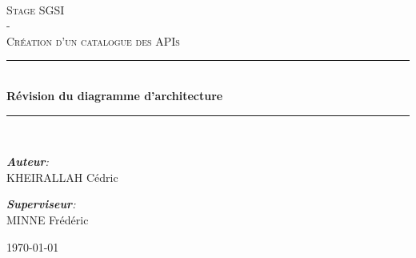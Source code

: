\begin{titlepage}

    \newcommand{\HRule}{\rule{\linewidth}{0.5mm}} %
    \center 
     
    \vspace*{0.8cm}
    \\[1cm]
    
    \textsc{\Large Stage SGSI\\ - \\ \bigskip Création d'un catalogue des APIs}\\[1.5cm] %
    
    \HRule \\[0.8cm]
    
    {\huge \bfseries Révision du diagramme d'architecture}\\[0.7cm] %
    
    \HRule \\[1.5cm]
    
    
    \large
    

    \emph{\textbf{Auteur}:}\\
    KHEIRALLAH Cédric\\

    \vspace{1cm}

    \emph{\textbf{Superviseur}:}\\
    MINNE Frédéric\\

    \vfill
    
    \large \today
    
\end{titlepage}